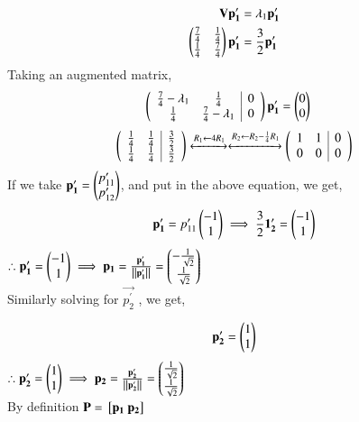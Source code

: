 \documentclass[journal]{IEEEtran}
\begin{document}
\begin{align}
	\mathbf{V}\mathbf{p_1^\prime} &= \lambda_1 \mathbf{p_1^\prime} \\
	\begin{pmatrix}\frac{7}{4} & \frac{1}{4} \\ \frac{1}{4} & \frac{7}{4}\end{pmatrix} \mathbf{p_1^\prime}  &= \frac{3}{2}\mathbf{p_1^\prime} \\
\end{align}
Taking an augmented matrix,
\begin{align}
	\left(
	\begin{array}{cc|c}
		\frac{7}{4} - \lambda_1 & \frac{1}{4} & 0\\ 
		\frac{1}{4} & \frac{7}{4} - \lambda_1& 0
	\end{array}\right)\mathbf{p_1^\prime}  &=  \begin{pmatrix}0 \\ 0\end{pmatrix} 
\end{align}
\begin{align}
	\left(
	\begin{array}{cc|c}
		\frac{1}{4} & \frac{1}{4} & \frac{3}{2}\\ 
		\frac{1}{4} & \frac{1}{4} & \frac{3}{2}
	\end{array}\right)
	\xleftrightarrow[]{R_1 \leftarrow {4 R_1}}
	\xleftrightarrow[]{R_2 \leftarrow {R_2-\frac{1}{4}R_1}}
	\left(
	\begin{array}{cc|c}
		1 & 1 & 0\\ 
		0 & 0 & 0
		\end{array}\right)
\end{align}
If we take $\mathbf{p_1^\prime}  = \begin{pmatrix}p_{11}^\prime \\ p_{12}^\prime\end{pmatrix}$, and put in the above equation, we get,
\begin{align}
	\mathbf{p_1^\prime} = p_{11}^\prime \begin{pmatrix}-1 \\ 1\end{pmatrix} \implies\frac{3}{2} \mathbf{1_2^\prime} =  \begin{pmatrix}-1 \\ 1\end{pmatrix}
\end{align}
$\therefore \mathbf{p_1^\prime}  = \begin{pmatrix}-1 \\ 1\end{pmatrix} \implies \mathbf{p_1} = \frac{\mathbf{p_1^\prime} }{\left\lVert\mathbf{p_1^\prime}\right\rVert}  = \begin{pmatrix} -\frac{1}{\sqrt{2}} \\ \frac{1}{\sqrt{2}}\end{pmatrix}$ \\
Similarly solving for $\vec{p_2^\prime}$ , we get,

\begin{align}
	\mathbf{p_2^\prime} &=  \begin{pmatrix}1 \\ 1\end{pmatrix} \\
\end{align} 
$\therefore \mathbf{p_2^\prime}  = \begin{pmatrix}1 \\ 1\end{pmatrix} \implies \mathbf{p_2} = \frac{\mathbf{p_2^\prime} }{\left\lVert\mathbf{p_2^\prime}\right\rVert}  = \begin{pmatrix} \frac{1}{\sqrt{2}} \\ \frac{1}{\sqrt{2}}\end{pmatrix}$ \\
By definition $\mathbf{P} = {}\left[\mathbf{p_1} ~ \mathbf{p_2}\right]$ \\ 
\end{document}

